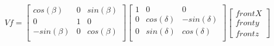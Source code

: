$$
Vf =
\begin{bmatrix}
  cos(β) & 0 & sin(β) \\
  0 & 1 & 0 \\
  -sin(β) & 0 & cos(β) \\
\end{bmatrix}
\begin{bmatrix}
  1 & 0 & 0 \\
  0 & cos(δ) & -sin(δ) \\
  0 & sin(δ) & cos(δ) \\
\end{bmatrix}
\begin{bmatrix}
  frontX \\
  fronty \\
  frontz
\end{bmatrix}
$$